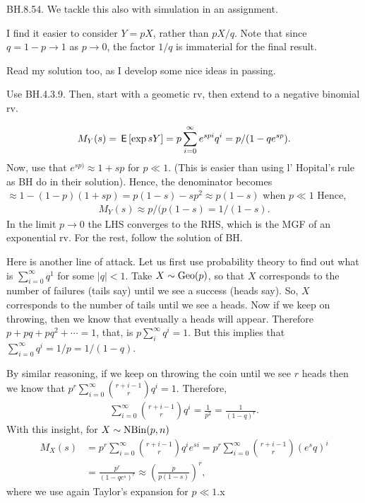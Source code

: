 \begin{exercise}
BH.8.54.  We tackle this also with simulation in an assignment.

I find it easier to consider $Y=pX$, rather than $pX/q$. Note that since $q=1-p\to 1$ as $p\to 0$, the factor $1/q$ is immaterial for the final result.

Read my solution too, as I develop some nice ideas in passing.

\begin{hint}
Use BH.4.3.9. Then, start with a geometic rv, then extend to a negative binomial rv.
\end{hint}
\begin{solution}
\begin{align*}
M_{Y}(s) =\,\mathsf{E}\left[\exp{s Y}\right] = p \sum_{i=0}^{\infty} e^{s p i} q^{i} = p/(1-qe^{sp}).
\end{align*}
Now, use that $e^{s p)} \approx 1 + s p$ for $p\ll 1$. (This is easier than using l' Hopital's rule as BH do in their solution). Hence, the denominator becomes $\approx 1-(1-p)(1+sp) = p(1-s) - sp^{2} \approx p(1-s)$ when $p\ll 1$ Hence,
\begin{align*}
M_{Y}(s) \approx p/(p(1-s) =  1/(1-s).
\end{align*}
In the limit $p\to 0$ the LHS converges to the RHS, which is the MGF of an exponential rv. For the rest, follow the solution of BH.

Here is another line of attack. Let us first use probability theory to find out what is $\sum_{i=0}^{\infty} q^{1}$ for some $|q|<1$. Take $X\sim\mathrm{Geo}(p)$, so that $X$ corresponds to the number of failures (tails say) until we see a success (heads say). So, $X$ corresponds to the number of tails until we see a heads. Now if we keep on throwing, then we know that eventually a heads will appear. Therefore $p + pq +pq^2 + \cdots = 1$, that, is $p\sum_i^{\infty} q^{i}=1$. But this implies that $\sum_{i=0}^{\infty}q^i = 1/ p = 1/(1-q)$.

By similar reasoning, if we keep on throwing the coin until we see $r$ heads then we know that $p^r \sum_{i=0}^{\infty} {r+i-1 \choose r} q^{i} = 1$.  Therefore,
\begin{align*}
\sum_{i=0}^{\infty} {r+i-1 \choose r} q^{i} =  \frac{1}{p^{2}}= \frac{1}{(1-q)^{r}}.
\end{align*}
With this insight, for $X\sim\mathrm{NBin}(p,n)$
\begin{align*}
  M_X(s) &= p^r \sum_{i=0}^{\infty} {r+i-1 \choose r} q^{i} e^{si}
 = p^r \sum_{i=0}^{\infty} {r+i-1 \choose r} (e^{s}q)^{i} \\
  &= \frac{p^r}{(1-qe^{s})^{r}} \approx \left(\frac{p}{p(1-s)}\right)^{r},
\end{align*}
where we use again Taylor's expansion for $p\ll 1$.x
\end{solution}
\end{exercise}






